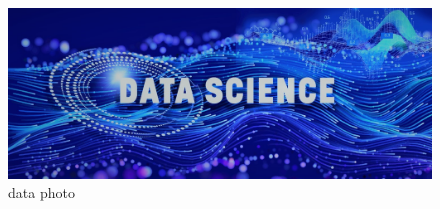 \documentclass{article}
\begin{document}
    \begin{figure}
        \centering
        \includegraphics[width=1\textwidth]{data.jpg}
        \caption{data photo}
    \end{figure}
\end{document}
